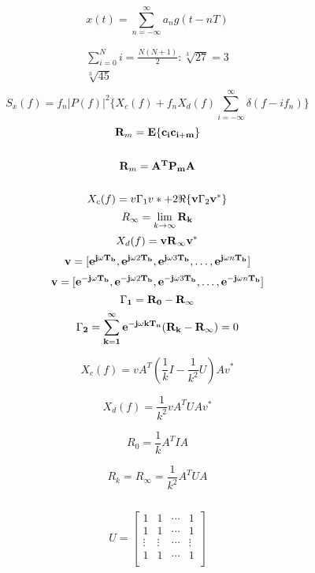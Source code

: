 

\[
x(t) = \sum\limits_{n =  - \infty }^\infty  {a_n } g(t - nT)
\]

\[
\begin{array}{l}
 \sum\limits_{i = 0}^N i  = \frac{{N(N + 1)}}{2}:\sqrt[3]{{27}} = 3 \\ 
 \sqrt[3]{{45}} \\ 
 \end{array}
\]
\[
S_x (f) = f_n \left| {P(f)} \right|^2 \{ X_c (f) + f_n X_d (f)\sum\limits_{i =  - \infty }^\infty  \delta  (f - if_n )\} 
\]
\[
\begin{array}{l}
 {\bf{R}}_m  = {\bf{E}}\{ {\bf{c}}_{\bf{i}} {\bf{c}}_{{\bf{i}} + {\bf{m}}} \}  \\ 
  \\ 
 \end{array}
\]
\[
\begin{array}{l}
 {\bf{R}}_m  = {\bf{A}}^{\bf{T}} {\bf{P}}_{\bf{m}} {\bf{A}} \\ 
  \\ 
 \end{array}
\]\[
X_c (f) = v\Gamma _1 v* + 2\Re \{ {\bf{v}}\Gamma _2 {\bf{v}}^* \} 
\]
\[
R_\infty   = \mathop {\lim }\limits_{k \to \infty } {\bf{R}}_{\bf{k}} 
\]
\[
X_d (f) = {\bf{vR}}_\infty  {\bf{v}}^* 
\]
\[
{\bf{v}} = [{\bf{e}}^{{\bf{j}}\omega {\bf{T}}_{\bf{b}} } ,{\bf{e}}^{{\bf{j}}\omega 2{\bf{T}}_{\bf{b}} } ,{\bf{e}}^{{\bf{j}}\omega 3{\bf{T}}_{\bf{b}} } , \ldots ,{\bf{e}}^{{\bf{j}}\omega n{\bf{T}}_{\bf{b}} } ]
\]
\[
{\bf{v}} = [{\bf{e}}^{ - {\bf{j}}\omega {\bf{T}}_{\bf{b}} } ,{\bf{e}}^{ - {\bf{j}}\omega 2{\bf{T}}_{\bf{b}} } ,{\bf{e}}^{ - {\bf{j}}\omega 3{\bf{T}}_{\bf{b}} } , \ldots ,{\bf{e}}^{ - {\bf{j}}\omega n{\bf{T}}_{\bf{b}} } ]
\]
\[
\Gamma _{\bf{1}}  = {\bf{R}}_{\bf{0}}  - {\bf{R}}_\infty  
\]
\[
\Gamma _{\bf{2}}  = \sum\limits_{{\bf{k}} = {\bf{1}}}^\infty  {{\bf{e}}^{ - {\bf{j}}\omega {\bf{kT}}_{\bf{n}} } } ({\bf{R}}_{\bf{k}}  - {\bf{R}}_\infty  ) = 0
\]

\[
X_c (f) = vA^T (\frac{1}{k}I - \frac{1}{{k^2 }}U)Av^* 
\]

\[
X_d (f) = \frac{1}{{k^2 }}vA^T UAv^* 
\]

\[
R_0  = \frac{1}{k}A^T IA
\]

\[
R_k  = R_\infty   = \frac{1}{{k^2 }}A^T UA
\]

\[

\]

\[
U = \left[ \begin{array}{l}
 1 & 1 &  \cdots  & 1 \\ 
 1 & 1 &  \cdots  & 1 \\ 
  \vdots  &  \vdots  &  \cdots  &  \vdots  \\ 
 1 & 1 &  \cdots  & 1 \\ 
 \end{array} \right]
\]

